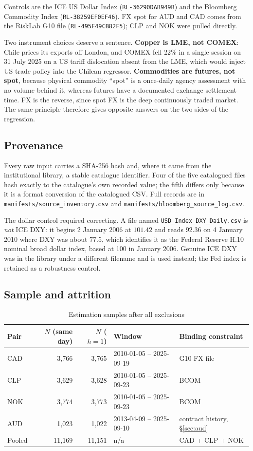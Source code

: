 \documentclass[11pt,a4paper]{article}
\begin{document}
Controls are the ICE US Dollar Index (\texttt{RL-36290DAB949B}) and the
Bloomberg Commodity Index (\texttt{RL-38259EF0EF46}). FX spot for AUD and CAD
comes from the RiskLab G10 file (\texttt{RL-495F49CB82F5}); CLP and NOK were
pulled directly.

Two instrument choices deserve a sentence. \textbf{Copper is LME, not COMEX}:
Chile prices its exports off London, and COMEX fell 22\% in a single session on
31 July 2025 on a US tariff dislocation absent from the LME, which would inject
US trade policy into the Chilean regressor. \textbf{Commodities are futures, not
spot}, because physical commodity ``spot'' is a once-daily agency assessment
with no volume behind it, whereas futures have a documented exchange settlement
time. FX is the reverse, since spot FX is the deep continuously traded market.
The same principle therefore gives opposite answers on the two sides of the
regression.

\subsection{Provenance}

Every raw input carries a SHA-256 hash and, where it came from the institutional
library, a stable catalogue identifier. Four of the five catalogued files hash
exactly to the catalogue's own recorded value; the fifth differs only because it
is a format conversion of the catalogued CSV. Full records are in
\texttt{manifests/source\_inventory.csv} and
\texttt{manifests/bloomberg\_source\_log.csv}.

The dollar control required correcting. A file named
\texttt{USD\_Index\_DXY\_Daily.csv} is \emph{not} ICE DXY: it begins 2 January
2006 at $101.42$ and reads $92.36$ on 4 January 2010 where DXY was about $77.5$,
which identifies it as the Federal Reserve H.10 nominal broad dollar index,
based at 100 in January 2006. Genuine ICE DXY was in the library under a
different filename and is used instead; the Fed index is retained as a
robustness control.

\subsection{Sample and attrition}

\begin{table}[htbp]
\centering
\caption{Estimation samples after all exclusions}
\begin{tabular}{lrrll}
\toprule
Pair & $N$ (same day) & $N$ ($h=1$) & Window & Binding constraint \\
\midrule
CAD    & 3{,}766  & 3{,}765  & 2010-01-05 -- 2025-09-19 & G10 FX file \\
CLP    & 3{,}629  & 3{,}628  & 2010-01-05 -- 2025-09-23 & BCOM \\
NOK    & 3{,}774  & 3{,}773  & 2010-01-05 -- 2025-09-23 & BCOM \\
AUD    & 1{,}023  & 1{,}022  & 2013-04-09 -- 2025-09-10 & contract history, \S\ref{sec:aud} \\
Pooled & 11{,}169 & 11{,}151 & n/a & CAD + CLP + NOK \\
\bottomrule
\end{tabular}
\end{table}
\end{document}
